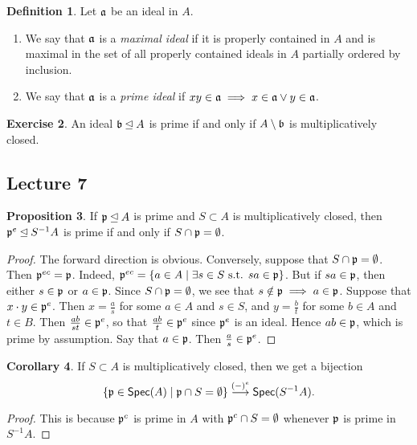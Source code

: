 \documentclass[10pt,letterpaper,cm]{nupset}
\theoremstyle{definition}
\newtheorem{definition}{Definition}[subsection]
\theoremstyle{theorem}
\newtheorem{prop}[definition]{Proposition}
\newtheorem{corollary}[definition]{Corollary}
\newtheorem{exercise}[definition]{Exercise}
\theoremstyle{remark}
\newcommand{\1}{\mathbf{1}}
\newcommand{\p}{\frak{p}}
\newcommand{\0}{\vec 0}
\begin{document}
\medskip


\begin{definition} Let $\frak{a}$ be an ideal in $A$.
\begin{enumerate}
\item We say that $\frak{a}$ is a \textit{maximal ideal} if it is properly contained in $A$ and is maximal in the set of   all properly contained ideals in $A$ partially ordered by inclusion.
\item We say that $\frak{a}$ is a \textit{prime ideal} if $xy\in \frak{a} \implies x \in \frak{a} \vee y \in \frak{a}$.
\end{enumerate}
\end{definition}

\begin{exercise}
An ideal $\frak{b} \unlhd A$ is prime if and only if $A \setminus \frak{b}$ is multiplicatively closed. 
\end{exercise}

\subsection{Lecture 7}

\begin{prop}  If $\frak{p} \unlhd A$ is prime and $ S\subset A$ is multiplicatively closed, then $\frak{p}^e \unlhd S^{-1}A$ is prime if and only if $S \cap \frak{p} = \emptyset$. 
\end{prop}
\begin{proof}
The forward direction is obvious. Conversely, suppose that $S \cap \frak{p} = \emptyset$. Then $\p^{ec} = \p$. Indeed, $\p^{ec} = \left\{a\in A\mid \exists s \in S \text{ s.t. } sa \in \p \right\}$. But if $sa\in \p$, then either $s\in \p$ or $a\in \p$. Since $S \cap \p = \emptyset$, we see that $s\notin \p \implies a\in \p$. Suppose that $x\cdot y\in \p^e$. Then $x= \frac{a}{s}$ for some $a\in A$ and $s\in S$, and $y = \frac{b}{t}$ for some $b\in A$ and $t\in B$.  Then $\frac{ab}{st}\in \p^e$, so that $\frac{ab}{t} \in \p^e$ since $\p^e$ is an ideal. Hence $ab \in \p$, which is prime by assumption. Say that $a\in \p$. Then $\frac{a}{s} \in \p^e$. 
\end{proof}

\begin{corollary} If $S \subset A$ is multiplicatively closed, then we get a bijection $$\left\{ \p \in \mathsf{Spec}(A) \mid \p \cap S=\emptyset\right\} \overset{(-)^e}{\longrightarrow}\mathsf{Spec}(S^{-1}A).$$  
\end{corollary}
\begin{proof}
This is because $\p^c$ is prime in $A$ with $\p^c \cap S = \emptyset$ whenever $\p$ is prime in $S^{-1}A$.
\end{proof}
\end{document}
